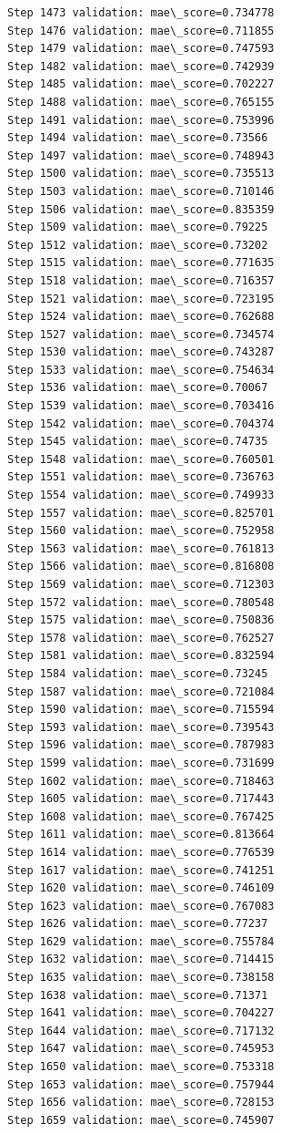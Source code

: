 \documentclass[11pt]{article}
\begin{document}
\begin{Verbatim}[commandchars=\\\{\}]
Step 1473 validation: mae\_score=0.734778
Step 1476 validation: mae\_score=0.711855
Step 1479 validation: mae\_score=0.747593
Step 1482 validation: mae\_score=0.742939
Step 1485 validation: mae\_score=0.702227
Step 1488 validation: mae\_score=0.765155
Step 1491 validation: mae\_score=0.753996
Step 1494 validation: mae\_score=0.73566
Step 1497 validation: mae\_score=0.748943
Step 1500 validation: mae\_score=0.735513
Step 1503 validation: mae\_score=0.710146
Step 1506 validation: mae\_score=0.835359
Step 1509 validation: mae\_score=0.79225
Step 1512 validation: mae\_score=0.73202
Step 1515 validation: mae\_score=0.771635
Step 1518 validation: mae\_score=0.716357
Step 1521 validation: mae\_score=0.723195
Step 1524 validation: mae\_score=0.762688
Step 1527 validation: mae\_score=0.734574
Step 1530 validation: mae\_score=0.743287
Step 1533 validation: mae\_score=0.754634
Step 1536 validation: mae\_score=0.70067
Step 1539 validation: mae\_score=0.703416
Step 1542 validation: mae\_score=0.704374
Step 1545 validation: mae\_score=0.74735
Step 1548 validation: mae\_score=0.760501
Step 1551 validation: mae\_score=0.736763
Step 1554 validation: mae\_score=0.749933
Step 1557 validation: mae\_score=0.825701
Step 1560 validation: mae\_score=0.752958
Step 1563 validation: mae\_score=0.761813
Step 1566 validation: mae\_score=0.816808
Step 1569 validation: mae\_score=0.712303
Step 1572 validation: mae\_score=0.780548
Step 1575 validation: mae\_score=0.750836
Step 1578 validation: mae\_score=0.762527
Step 1581 validation: mae\_score=0.832594
Step 1584 validation: mae\_score=0.73245
Step 1587 validation: mae\_score=0.721084
Step 1590 validation: mae\_score=0.715594
Step 1593 validation: mae\_score=0.739543
Step 1596 validation: mae\_score=0.787983
Step 1599 validation: mae\_score=0.731699
Step 1602 validation: mae\_score=0.718463
Step 1605 validation: mae\_score=0.717443
Step 1608 validation: mae\_score=0.767425
Step 1611 validation: mae\_score=0.813664
Step 1614 validation: mae\_score=0.776539
Step 1617 validation: mae\_score=0.741251
Step 1620 validation: mae\_score=0.746109
Step 1623 validation: mae\_score=0.767083
Step 1626 validation: mae\_score=0.77237
Step 1629 validation: mae\_score=0.755784
Step 1632 validation: mae\_score=0.714415
Step 1635 validation: mae\_score=0.738158
Step 1638 validation: mae\_score=0.71371
Step 1641 validation: mae\_score=0.704227
Step 1644 validation: mae\_score=0.717132
Step 1647 validation: mae\_score=0.745953
Step 1650 validation: mae\_score=0.753318
Step 1653 validation: mae\_score=0.757944
Step 1656 validation: mae\_score=0.728153
Step 1659 validation: mae\_score=0.745907

\end{Verbatim}
\end{document}
